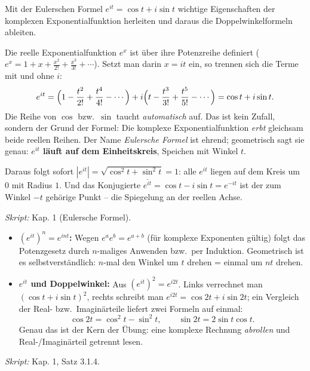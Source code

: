 

Mit der Eulerschen Formel $e^{it}=\cos t+i\sin t$ wichtige Eigenschaften
der komplexen Exponentialfunktion herleiten und daraus die
Doppelwinkelformeln ableiten.

\begin{werkzeugkasten}[Woher kommt $e^{it}=\cos t+i\sin t$?]
Die reelle Exponentialfunktion $e^x$ ist über ihre Potenzreihe definiert
($e^x=1+x+\frac{x^2}{2!}+\frac{x^3}{3!}+\cdots$). Setzt man darin $x=it$
ein, so trennen sich die Terme mit und ohne $i$:
\begin{equation*}
  e^{it}
  =\Bigl(1-\frac{t^2}{2!}+\frac{t^4}{4!}-\cdots\Bigr)
  +i\Bigl(t-\frac{t^3}{3!}+\frac{t^5}{5!}-\cdots\Bigr)
  =\cos t+i\sin t .
\end{equation*}
Die Reihe von $\cos$ bzw.\ $\sin$ taucht \emph{automatisch} auf. Das ist
kein Zufall, sondern der Grund der Formel: Die komplexe Exponentialfunktion
\emph{erbt} gleichsam beide reellen Reihen. Der Name \emph{Eulersche Formel} ist
ehrend; geometrisch sagt sie genau: \textbf{$e^{it}$ läuft auf dem
Einheitskreis}, Speichen mit Winkel $t$.

Daraus folgt sofort $|e^{it}|=\sqrt{\cos^2t+\sin^2t}=1$: alle $e^{it}$
liegen auf dem Kreis um $0$ mit Radius $1$. Und das Konjugierte
$\overline{e^{it}}=\cos t-i\sin t=e^{-it}$ ist der zum Winkel $-t$
gehörige Punkt -- die Spiegelung an der reellen Achse.

\textit{Skript:} Kap. 1 (Eulersche Formel).
\end{werkzeugkasten}

\begin{werkzeugkasten}
\begin{itemize}
  \item \textbf{$(e^{it})^n=e^{int}$:} Wegen $e^{a}e^{b}=e^{a+b}$ (für
        komplexe Exponenten gültig) folgt das Potenzgesetz durch
        $n$-maliges Anwenden bzw.\ per Induktion. Geometrisch ist es
        selbstverständlich: $n$-mal den Winkel um $t$ drehen = einmal um
        $nt$ drehen.
  \item \textbf{$e^{it}$ und Doppelwinkel:} Aus $(e^{it})^2=e^{i2t}$.
        Links verrechnet man $(\cos t+i\sin t)^2$, rechts schreibt man
        $e^{i2t}=\cos 2t+i\sin 2t$; ein Vergleich der Real- bzw.\
        Imaginärteile liefert zwei Formeln auf einmal:
        \begin{equation*}
          \cos 2t=\cos^2t-\sin^2t,\qquad \sin 2t=2\sin t\cos t .
        \end{equation*}
        Genau das ist der Kern der Übung: eine komplexe Rechnung \emph{abrollen}
        und Real-/Imaginärteil getrennt lesen.
\end{itemize}
\textit{Skript:} Kap. 1, Satz 3.1.4.
\end{werkzeugkasten}

